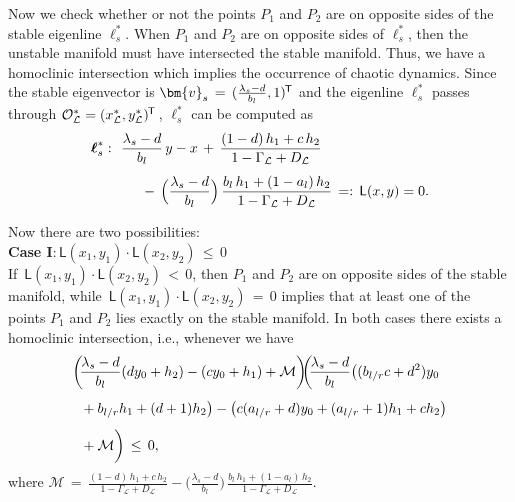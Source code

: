 \documentclass{article}
\theoremstyle{example}
\theoremstyle{plain}
\theoremstyle{definition}
\theoremstyle{remark}
\def\vv{{\bm{v}}}
\newcommand*{\tran}{^{\mkern-1.5mu\mathsf{T}}}
\begin{document}
Now we check whether or not the points $P_1$ and $P_2$ are on opposite sides of the stable eigenline $\boldsymbol\ell^{*}_{s}$. When $P_1$ and $P_2$ are on opposite sides of $\boldsymbol\ell^{*}_{s}$, then the unstable manifold must have intersected the stable manifold. Thus, we have a homoclinic intersection which implies the occurrence of chaotic dynamics. 
Since the stable eigenvector is $\vv_{s}\, = \,(\frac{\lambda_{s}-d}{b_l},1)\tran$ and the eigenline $\boldsymbol\ell^{*}_{s}$ passes through $\mathcal{O}^{*}_{\mathcal{L}}=(x^{*}_{\mathcal{L}}, y^{*}_{\mathcal{L}})\tran\,$, 
$\boldsymbol\ell^{*}_{s}$ can be computed as
\begin{align}\nonumber
 \boldsymbol\ell^{*}_{s}:\, \, \,  & \, \frac{\lambda_{s}-d}{b_l}\,y  - x \, + \, \frac{(1-d)\, h_1 + c \, h_2}{1-\Gamma_{\mathcal{L}}+D_{\mathcal{L}}}
%
\\[1ex]\label{eq-L}
%
& \hspace{.5cm}\, - \, \Big(\frac{\lambda_{s}-d}{b_l}\Big) \, \frac{b_{l}\, h_1 +(1-a_{l}) \, h_2}{1-\Gamma_{\mathcal{L}}+D_{\mathcal{L}}} \, =: \, \mathsf{L}(x,y) = 0. 
\end{align}

Now there are two possibilities:\\[2ex]
\textbf{Case I}:$\,\mathsf{L}(x_1,y_1)  \cdot  \mathsf{L}(x_2,y_2) \, \leq \,  0$\\[2ex]
%
If $\,\mathsf{L}(x_1,y_1)  \cdot  \mathsf{L}(x_2,y_2) \, < \,  0$, 
then $P_{1}$ and $P_{2}$ are on opposite sides of the stable manifold, while $\,\mathsf{L}(x_1,y_1)  \cdot  \mathsf{L}(x_{2},y_{2}) \, = \,  0$ implies that at least one of the points $P_{1}$ and $P_{2}$ lies exactly on the stable manifold. In both cases there exists a homoclinic intersection, i.e., whenever we have 
\begin{align}\nonumber
& \bigg(\hspace{-.08cm}\frac{\lambda_{s}-d}{b_l}(d y_0 +h_2) - (cy_0 +h_1) +  \mathcal{M} \bigg) 
\hspace{-.11cm}
\bigg(\hspace{-.08cm}\frac{\lambda_{s}-d}{b_l}\big((b_{l/r} c +d^2) y_0 
%
\\[1ex]\nonumber
%
& \hspace{.2cm} + b_{l/r} h_1  +  (d+1)h_2 \big) -  \big(c(a_{l/r}+d)y_0 + (a_{l/r}+1)h_1 +ch_2 \big)  
%
\\[1ex]\label{homo-con}
%
& \hspace{.2cm}
+   \mathcal{M} \bigg)  \, \leq \, 0,  
\end{align}
where $\mathcal{M} \, = \, \frac{(1-d)\, h_1 + c \, h_2}{1-\Gamma_{\mathcal{L}}+D_{\mathcal{L}}} -  \Big(\frac{\lambda_{s}-d}{b_l}\Big) \, \frac{b_{l}\, h_1 +(1-a_{l}) \, h_2}{1-\Gamma_{\mathcal{L}}+D_{\mathcal{L}}}$.\\
\end{document}
